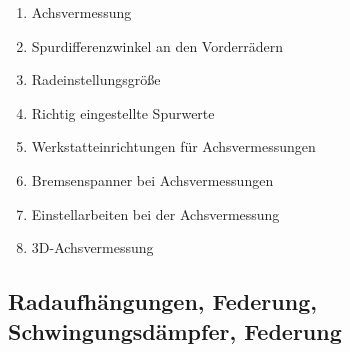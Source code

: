 \begin{enumerate}
\item
  Achsvermessung\\
\item
  Spurdifferenzwinkel an den Vorderrädern\\
\item
  Radeinstellungsgröße\\
\item
  Richtig eingestellte Spurwerte\\
\item
  Werkstatteinrichtungen für Achsvermessungen\\
\item
  Bremsenspanner bei Achsvermessungen\\
\item
  Einstellarbeiten bei der Achsvermessung\\
\item
  3D-Achsvermessung
\end{enumerate}

\subsection{Radaufhängungen, Federung, Schwingungsdämpfer,
Federung}\label{radaufhaengungen-federung-schwingungsdaempfer-federung}

